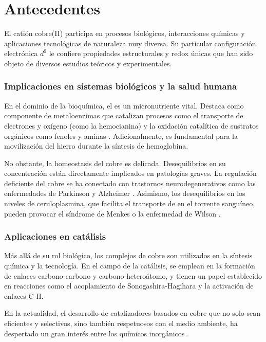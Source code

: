\chapter{Antecedentes}

    El catión cobre(II) participa en procesos biológicos, interacciones químicas y aplicaciones tecnológicas de naturaleza muy diversa. Su particular configuración electrónica $d^9$ le confiere propiedades estructurales y redox únicas que han sido objeto de diversos estudios teóricos y experimentales.

        \subsection*{Implicaciones en sistemas biológicos y la salud humana}

        En el dominio de la bioquímica, el  es un micronutriente vital. Destaca como componente de metaloenzimas que catalizan procesos como el transporte de electrones y oxígeno (como la hemocianina) y la oxidación catalítica de sustratos orgánicos como fenoles y aminas \cite{Cu-2014-01, Wa-2024-03, Wa-2017-01, Wa-2009-01}. Adicionalmente, es fundamental para la movilización del hierro durante la síntesis de hemoglobina.

        No obstante, la homeostasis del cobre es delicada. Desequilibrios en su concentración están directamente implicados en patologías graves. La regulación deficiente del cobre se ha conectado con trastornos neurodegenerativos como las enfermedades de Parkinson y Alzheimer \cite{Cu-2014-02,Cu-2011-02, Cu-2012-01}. Asimismo, los desequilibrios en los niveles de ceruloplasmina, que facilita el transporte de  en el torrente sanguíneo, pueden provocar el síndrome de Menkes o la enfermedad de Wilson \cite{Cu-2001-01, Cu-2017-01}.

        \subsection*{Aplicaciones en catálisis}

        Más allá de su rol biológico, los complejos de cobre son utilizados en la síntesis química y la tecnología. En el campo de la catálisis, se emplean en la formación de enlaces carbono-carbono y carbono-heteroátomo, y tienen un papel establecido en reacciones como el acoplamiento de Sonogashira-Hagihara y la activación de enlaces C-H. 
        
        En la actualidad, el desarrollo de catalizadores basados en cobre que no solo sean eficientes y selectivos, sino también respetuosos con el medio ambiente, ha despertado un gran interés entre los químicos inorgánicos \cite{Cu-2014-01}.



